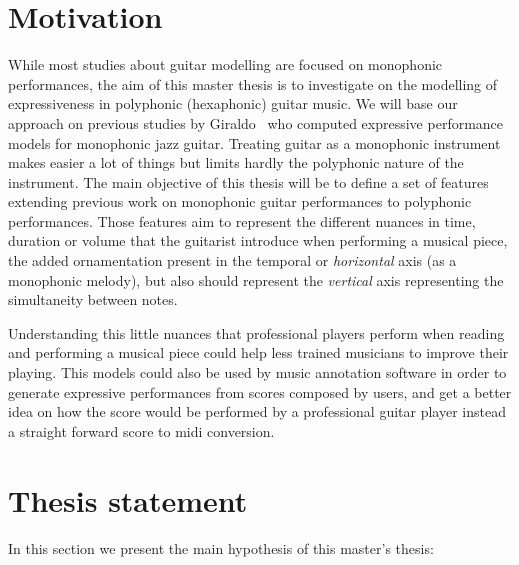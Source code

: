 \section{Motivation}
\label{sec:motivation}
While most studies about guitar modelling are focused on monophonic performances, the aim of this master thesis is to investigate on the modelling of expressiveness in polyphonic (hexaphonic) guitar music. We will base our approach on previous studies by Giraldo~\cite{Giraldo2016} who computed expressive performance models for monophonic jazz guitar. Treating guitar as a monophonic instrument makes easier a lot of things  but limits hardly the polyphonic nature of the instrument. The main objective of this thesis will be to define a set of features extending previous work on monophonic guitar performances to polyphonic performances. Those features aim to represent the different nuances in time, duration or volume that the guitarist introduce when performing a musical piece, the added ornamentation present in the temporal or \textit{horizontal} axis (as a monophonic melody), but also should represent the \textit{vertical} axis representing the simultaneity between notes. 

Understanding this little nuances that professional players perform when reading and performing a musical piece could help less trained musicians to improve their playing. This models could also be used by music annotation software in order to generate expressive performances from scores composed by users, and get a better idea on how the score would be performed by a professional guitar player instead a straight forward score to midi conversion.


\section{Thesis statement}
In this section we present the main hypothesis of this master's thesis:


